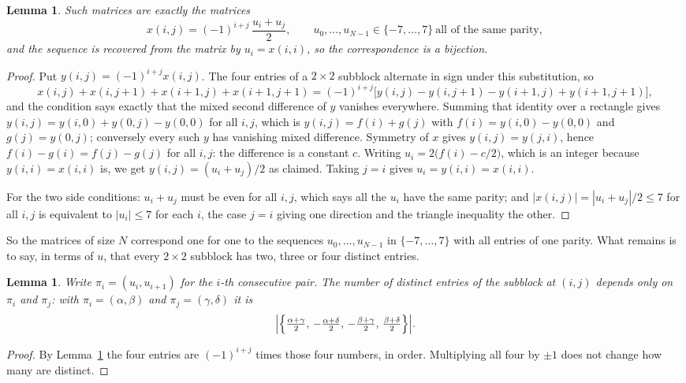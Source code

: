 \documentclass[11pt,a4paper]{article}
\theoremstyle{plain}
\newtheorem{lemma}[theorem]{Lemma}
\theoremstyle{definition}
\begin{document}
\begin{lemma}\label{lem:solve}
Such matrices are exactly the matrices
\[
x(i,j)=(-1)^{i+j}\,\frac{u_i+u_j}{2},
\qquad u_0,\dots,u_{N-1}\in\{-7,\dots,7\}\ \text{all of the same parity},
\]
and the sequence is recovered from the matrix by $u_i=x(i,i)$, so the correspondence is a
bijection.
\end{lemma}

\begin{proof}
Put $y(i,j)=(-1)^{i+j}x(i,j)$. The four entries of a $2\times2$ subblock alternate in sign
under this substitution, so
\[
x(i,j)+x(i,j{+}1)+x(i{+}1,j)+x(i{+}1,j{+}1)
=(-1)^{i+j}\bigl[y(i,j)-y(i,j{+}1)-y(i{+}1,j)+y(i{+}1,j{+}1)\bigr],
\]
and the condition says exactly that the mixed second difference of $y$ vanishes everywhere.
Summing that identity over a rectangle gives
$y(i,j)=y(i,0)+y(0,j)-y(0,0)$ for all $i,j$, which is $y(i,j)=f(i)+g(j)$ with
$f(i)=y(i,0)-y(0,0)$ and $g(j)=y(0,j)$; conversely every such $y$ has vanishing mixed
difference. Symmetry of $x$ gives $y(i,j)=y(j,i)$, hence $f(i)-g(i)=f(j)-g(j)$ for all $i,j$:
the difference is a constant $c$. Writing $u_i=2\bigl(f(i)-c/2\bigr)$, which is an integer
because $y(i,i)=x(i,i)$ is, we get $y(i,j)=(u_i+u_j)/2$ as claimed. Taking $j=i$ gives
$u_i=y(i,i)=x(i,i)$.

For the two side conditions: $u_i+u_j$ must be even for all $i,j$, which says all the $u_i$ have
the same parity; and $|x(i,j)|=|u_i+u_j|/2\le7$ for all $i,j$ is equivalent to $|u_i|\le7$
for each $i$, the case $j=i$ giving one direction and the triangle inequality the other.
\end{proof}

So the matrices of size $N$ correspond one for one to the sequences $u_0,\dots,u_{N-1}$ in
$\{-7,\dots,7\}$ with all entries of one parity. What remains is to say, in terms of $u$,
that every $2\times2$ subblock has two, three or four distinct entries.

\begin{lemma}\label{lem:block}
Write $\pi_i=(u_i,u_{i+1})$ for the $i$-th consecutive pair. The number of distinct entries of
the subblock at $(i,j)$ depends only on $\pi_i$ and $\pi_j$: with $\pi_i=(\alpha,\beta)$ and
$\pi_j=(\gamma,\delta)$ it is
\[
\Bigl|\Bigl\{\tfrac{\alpha+\gamma}{2},\,-\tfrac{\alpha+\delta}{2},\,
-\tfrac{\beta+\gamma}{2},\,\tfrac{\beta+\delta}{2}\Bigr\}\Bigr| .
\]
\end{lemma}

\begin{proof}
By Lemma~\ref{lem:solve} the four entries are $(-1)^{i+j}$ times those four numbers, in
order. Multiplying all four by $\pm1$ does not change how many are distinct.
\end{proof}
\end{document}
